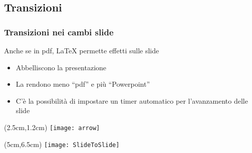 \subsection{Transizioni} 
\begin{frame}
  \frametitle{Transizioni nei cambi slide}
  
  Anche se in pdf, \LaTeX{} permette effetti sulle slide
  \begin{itemize}
    \item Abbelliscono la presentazione
    \item La rendono meno ``pdf'' e più ``Powerpoint''
    \item C'è la possibilità di impostare un timer automatico per l'avanzamento delle slide
  \end{itemize}
  
  \begin{textblock*}{5cm}(2.5cm,1.2cm)
    \texttt{[image: arrow]}
  \end{textblock*}
  
  \begin{textblock*}{5cm}(5cm,6.5cm)
    \texttt{[image: SlideToSlide]}
  \end{textblock*}

\end{frame}


